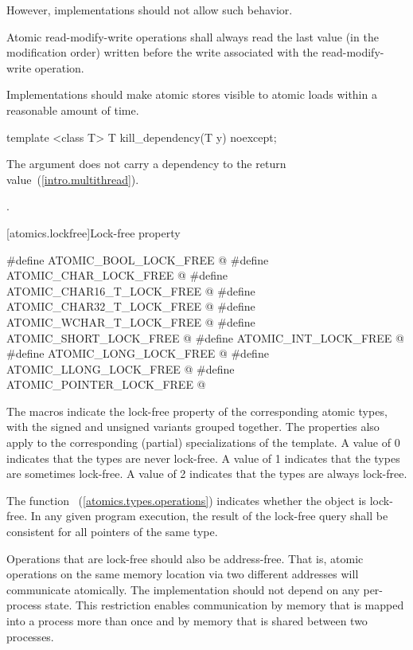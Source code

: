 However, implementations should not allow such behavior.\exitnote

\pnum
Atomic read-modify-write operations shall always read the last value
(in the modification order) written before the write associated with
the read-modify-write operation.

\pnum
Implementations should make atomic stores visible to atomic loads within a reasonable
amount of time.

%
\begin{itemdecl}
template <class T>
  T kill_dependency(T y) noexcept;
\end{itemdecl}

\begin{itemdescr}
\pnum
\effects The argument does not carry a dependency to the return
value~(\ref{intro.multithread}).

\pnum
\returns {}.
\end{itemdescr}


[atomics.lockfree]{Lock-free property}

\begin{codeblock}
#define ATOMIC_BOOL_LOCK_FREE @\unspec@
#define ATOMIC_CHAR_LOCK_FREE @\unspec@
#define ATOMIC_CHAR16_T_LOCK_FREE @\unspec@
#define ATOMIC_CHAR32_T_LOCK_FREE @\unspec@
#define ATOMIC_WCHAR_T_LOCK_FREE @\unspec@
#define ATOMIC_SHORT_LOCK_FREE @\unspec@
#define ATOMIC_INT_LOCK_FREE @\unspec@
#define ATOMIC_LONG_LOCK_FREE @\unspec@
#define ATOMIC_LLONG_LOCK_FREE @\unspec@
#define ATOMIC_POINTER_LOCK_FREE @\unspec@
\end{codeblock}

\pnum
The  macros indicate the lock-free property of the
corresponding atomic types, with the signed and unsigned variants grouped
together. The properties also apply to the corresponding (partial) specializations of the
 template. A value of 0 indicates that the types are never
lock-free. A value of 1 indicates that the types are sometimes lock-free. A
value of 2 indicates that the types are always lock-free.

\pnum
The function ~(\ref{atomics.types.operations})
indicates whether the object is lock-free. In any given program execution, the
result of the lock-free query shall be consistent for all pointers of the same
type.

\pnum
\enternote Operations that are lock-free should also be address-free. That is,
atomic operations on the same memory location via two different addresses will
communicate atomically. The implementation should not depend on any
per-process state. This restriction enables communication  by memory that is
mapped into a process more than once and by memory that is shared between two
processes. \exitnote

